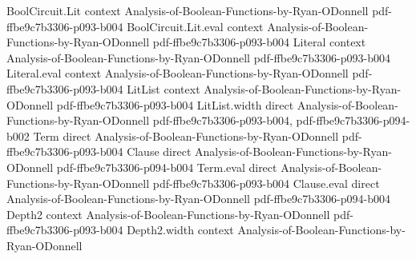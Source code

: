 \begin{theorem}
\leanok
{}
\proofstep
  {BoolCircuit.Lit}
  {context}
  {Analysis-of-Boolean-Functions-by-Ryan-ODonnell}
  {pdf-ffbe9c7b3306-p093-b004}
\proofstep
  {BoolCircuit.Lit.eval}
  {context}
  {Analysis-of-Boolean-Functions-by-Ryan-ODonnell}
  {pdf-ffbe9c7b3306-p093-b004}
\proofstep
  {Literal}
  {context}
  {Analysis-of-Boolean-Functions-by-Ryan-ODonnell}
  {pdf-ffbe9c7b3306-p093-b004}
\proofstep
  {Literal.eval}
  {context}
  {Analysis-of-Boolean-Functions-by-Ryan-ODonnell}
  {pdf-ffbe9c7b3306-p093-b004}
\proofstep
  {LitList}
  {context}
  {Analysis-of-Boolean-Functions-by-Ryan-ODonnell}
  {pdf-ffbe9c7b3306-p093-b004}
\proofstep
  {LitList.width}
  {direct}
  {Analysis-of-Boolean-Functions-by-Ryan-ODonnell}
  {pdf-ffbe9c7b3306-p093-b004,
    pdf-ffbe9c7b3306-p094-b002}
\proofstep
  {Term}
  {direct}
  {Analysis-of-Boolean-Functions-by-Ryan-ODonnell}
  {pdf-ffbe9c7b3306-p093-b004}
\proofstep
  {Clause}
  {direct}
  {Analysis-of-Boolean-Functions-by-Ryan-ODonnell}
  {pdf-ffbe9c7b3306-p094-b004}
\proofstep
  {Term.eval}
  {direct}
  {Analysis-of-Boolean-Functions-by-Ryan-ODonnell}
  {pdf-ffbe9c7b3306-p093-b004}
\proofstep
  {Clause.eval}
  {direct}
  {Analysis-of-Boolean-Functions-by-Ryan-ODonnell}
  {pdf-ffbe9c7b3306-p094-b004}
\proofstep
  {Depth2}
  {context}
  {Analysis-of-Boolean-Functions-by-Ryan-ODonnell}
  {pdf-ffbe9c7b3306-p093-b004}
\proofstep
  {Depth2.width}
  {context}
  {Analysis-of-Boolean-Functions-by-Ryan-ODonnell}

\end{theorem}
